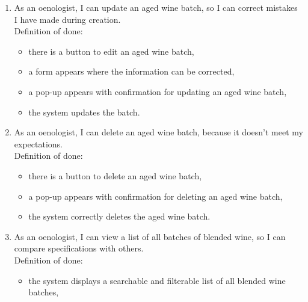 \begin{enumerate}
	\begin{itemize}
		\item there is a button to start a new aged wine batch,
		\item a form appears where details can be selected, such as the piece of equipment where the aged wine batch is to begin, as well as one or more batches of fermented must and the quantity from which the batch is to be produced,
		\item there is a button to confirm the creation of a new aged wine batch,
		\item a pop-up appears with confirmation for creating a new aged wine batch,
		\item the system automatically generates a batch number.
	\end{itemize}
	\item As an oenologist, I can update an aged wine batch, so I can correct mistakes I have made during creation.
	\\Definition of done:
	\begin{itemize}
		\item there is a button to edit an aged wine batch,
		\item a form appears where the information can be corrected,
		\item a pop-up appears with confirmation for updating an aged wine batch,
		\item the system updates the batch.
	\end{itemize}
	\item As an oenologist, I can delete an aged wine batch, because it doesn't meet my expectations.
	\\Definition of done:
	\begin{itemize}
		\item there is a button to delete an aged wine batch,
		\item a pop-up appears with confirmation for deleting an aged wine batch,
		\item the system correctly deletes the aged wine batch.
	\end{itemize}
	\item As an oenologist, I can view a list of all batches of blended wine, so I can compare specifications with others.
	\\Definition of done:
	\begin{itemize}
		\item the system displays a searchable and filterable list of all blended wine batches,

\end{itemize}
\end{enumerate}
